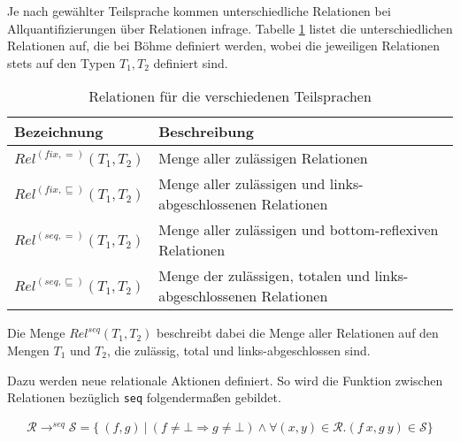 Je nach gewählter Teilsprache kommen unterschiedliche Relationen bei Allquantifizierungen über Relationen infrage. Tabelle
\ref{tab:relations} listet die unterschiedlichen Relationen auf, die bei Böhme definiert werden, wobei die jeweiligen Relationen
stets auf den Typen $T_1, T_2$ definiert sind.

\begin{table}[th]
\centering
\begin{tabular}{| l | l |}
\hline
Bezeichnung & Beschreibung \\
\hline
$Rel^{(fix, =)}(T_1, T_2)$ & Menge aller zulässigen Relationen \\
$Rel^{(fix, \sqsubseteq)}(T_1, T_2)$ & Menge aller zulässigen und links-abgeschlossenen Relationen \\
$Rel^{(seq, =)}(T_1, T_2)$ & Menge aller zulässigen und bottom-reflexiven Relationen \\
$Rel^{(seq, \sqsubseteq)}(T_1, T_2)$ & Menge der zulässigen, totalen und links-abgeschlossenen Relationen \\
\hline
\end{tabular}
\caption{Relationen für die verschiedenen Teilsprachen}
\label{tab:relations}
\end{table}


Die Menge $Rel^{seq}(T_1, T_2)$ beschreibt dabei die Menge aller Relationen auf den Mengen $T_1$ und $T_2$, die zulässig,
total und links-abgeschlossen sind.

Dazu werden neue relationale Aktionen definiert. So wird die Funktion zwischen Relationen bezüglich \texttt{seq} folgendermaßen
gebildet.

\begin{align*}
\mathcal{R} \rightarrow^{seq} \mathcal{S} = \{~(f, g)~|~(f \neq \bot \Rightarrow g \neq \bot) \wedge
\forall (x, y) \in \mathcal{R}. (f\ x, g\ y) \in \mathcal{S} \}
\end{align*}